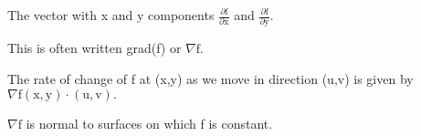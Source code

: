 The vector with x and y components $ \frac {\partial \mathrm{f}}{\partial 
\mathrm{x}} $ and $ \frac {\partial \mathrm{f}}{\partial \mathrm{y}} . $
\par
This is often written grad(f) or $ \nabla \mathrm{f} . $
\par
The rate of change of f at (x,y) as we move in direction (u,v)
is given by $ \nabla \mathrm{f(x,y)} \cdot \mathrm{(u,v)} . $
\par
 $ \nabla \mathrm{f} $ is normal to surfaces on which f is constant.